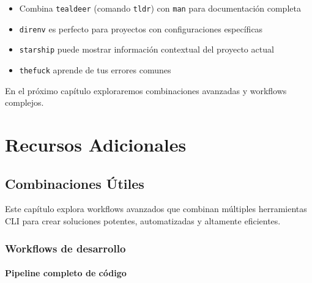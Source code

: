 \documentclass[
  11pt,
  letterpaper,
  oneside,
  openany]{scrbook}
\providecommand{\tightlist}{%
  \setlength{\itemsep}{0pt}\setlength{\parskip}{0pt}}
\begin{document}
\begin{tcolorbox}[enhanced jigsaw, coltitle=black, breakable, arc=.35mm, toprule=.15mm, colbacktitle=quarto-callout-tip-color!10!white, colframe=quarto-callout-tip-color-frame, opacityback=0, colback=white, bottomtitle=1mm, bottomrule=.15mm, rightrule=.15mm, left=2mm, toptitle=1mm, leftrule=.75mm, title=\textcolor{quarto-callout-tip-color}{\faLightbulb}\hspace{0.5em}{Tips para utilidades}, titlerule=0mm, opacitybacktitle=0.6]

\begin{itemize}
\tightlist
\item
  Combina \texttt{tealdeer} (comando \texttt{tldr}) con \texttt{man}
  para documentación completa
\item
  \texttt{direnv} es perfecto para proyectos con configuraciones
  específicas
\item
  \texttt{starship} puede mostrar información contextual del proyecto
  actual
\item
  \texttt{thefuck} aprende de tus errores comunes
\end{itemize}

\end{tcolorbox}

En el próximo capítulo exploraremos combinaciones avanzadas y workflows
complejos.

\part{Recursos Adicionales}

\chapter{Combinaciones Útiles}\label{combinaciones-uxfatiles}

Este capítulo explora workflows avanzados que combinan múltiples
herramientas CLI para crear soluciones potentes, automatizadas y
altamente eficientes.

\section{Workflows de desarrollo}\label{workflows-de-desarrollo}

\subsection{Pipeline completo de
código}\label{pipeline-completo-de-cuxf3digo}
\end{document}
